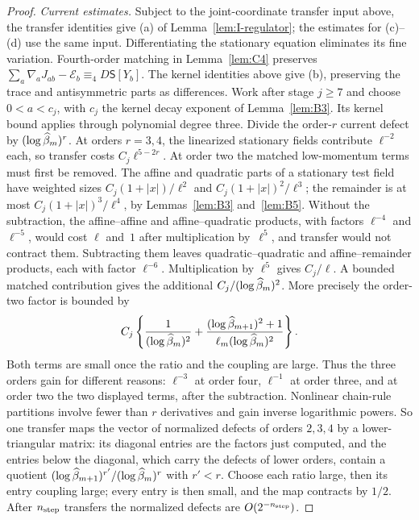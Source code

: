 \begin{proof}
\emph{Current estimates.} Subject to the joint-coordinate transfer input above, the transfer identities give (a) of Lemma~\ref{lem:I-regulator}; the estimates for (c)--(d) use the same input. Differentiating the stationary equation eliminates its fine variation. Fourth-order matching in Lemma~\ref{lem:C4} preserves $\sum_a\nabla_aJ_{ab}-\mathcal E_b\equiv_4D\mathsf S[Y_b]$. The kernel identities above give (b), preserving the trace and antisymmetric parts as differences.
Work after stage $j\ge7$ and choose $0<a<c_j$, with $c_j$ the kernel decay exponent of Lemma~\ref{lem:B3}. Its kernel bound applies through polynomial degree three. Divide the order-$r$ current defect by $(\log\widehat{\beta}_m)^r$. At orders $r=3,4$, the linearized stationary fields contribute $\ell^{-2}$ each, so transfer costs $C_j\ell^{5-2r}$. At order two the matched low-momentum terms must first be removed. The affine and quadratic parts of a stationary test field have weighted sizes $C_j(1+|x|)/\ell^2$ and $C_j(1+|x|)^2/\ell^3$; the remainder is at most $C_j(1+|x|)^3/\ell^4$, by Lemmas~\ref{lem:B3} and~\ref{lem:B5}. Without the subtraction, the affine--affine and affine--quadratic products, with factors $\ell^{-4}$ and $\ell^{-5}$, would cost $\ell$ and~$1$ after multiplication by~$\ell^5$, and transfer would not contract them. Subtracting them leaves quadratic--quadratic and affine--remainder products, each with factor $\ell^{-6}$. Multiplication by $\ell^5$ gives $C_j/\ell$. A bounded matched contribution gives the additional $C_j/(\log\widehat{\beta}_m)^2$. More precisely the order-two factor is bounded by
\begin{equation*}
C_j\left\{\frac{1}{(\log\widehat{\beta}_m)^2}
+\frac{(\log\widehat{\beta}_{m+1})^2+1}{\ell_m(\log\widehat{\beta}_m)^2}\right\}.
\end{equation*}
Both terms are small once the ratio and the coupling are large. Thus the three orders gain for different reasons: $\ell^{-3}$ at order four, $\ell^{-1}$ at order three, and at order two the two displayed terms, after the subtraction. Nonlinear chain-rule partitions involve fewer than $r$ derivatives and gain inverse logarithmic powers. So one transfer maps the vector of normalized defects of orders $2,3,4$ by a lower-triangular matrix: its diagonal entries are the factors just computed, and the entries below the diagonal, which carry the defects of lower orders, contain a quotient $(\log\widehat{\beta}_{m+1})^{r'}/(\log\widehat{\beta}_m)^r$ with $r'<r$. Choose each ratio large, then its entry coupling large; every entry is then small, and the map contracts by $1/2$. After $n_{\rm step}$ transfers the normalized defects are $O(2^{-n_{\rm step}})$.


\end{proof}

